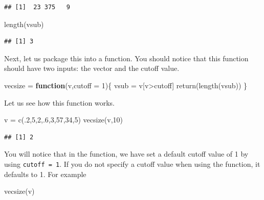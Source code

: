 \documentclass[
]{article}
\newenvironment{Shaded}{\begin{snugshade}}{\end{snugshade}}
\newcommand{\AttributeTok}[1]{\textcolor[rgb]{0.77,0.63,0.00}{#1}}
\newcommand{\ControlFlowTok}[1]{\textcolor[rgb]{0.13,0.29,0.53}{\textbf{#1}}}
\newcommand{\DecValTok}[1]{\textcolor[rgb]{0.00,0.00,0.81}{#1}}
\newcommand{\FunctionTok}[1]{\textcolor[rgb]{0.00,0.00,0.00}{#1}}
\newcommand{\NormalTok}[1]{#1}
\newcommand{\OtherTok}[1]{\textcolor[rgb]{0.56,0.35,0.01}{#1}}
\newcommand{\SpecialCharTok}[1]{\textcolor[rgb]{0.00,0.00,0.00}{#1}}
\begin{document}
\begin{verbatim}
## [1]  23 375   9
\end{verbatim}

\begin{Shaded}
\begin{Highlighting}[]
\FunctionTok{length}\NormalTok{(vsub)}
\end{Highlighting}
\end{Shaded}

\begin{verbatim}
## [1] 3
\end{verbatim}

Next, let us package this into a function. You should notice that this
function should have two inputs: the vector and the cutoff value.

\begin{Shaded}
\begin{Highlighting}[]
\NormalTok{vecsize }\OtherTok{=} \ControlFlowTok{function}\NormalTok{(v,}\AttributeTok{cutoff =} \DecValTok{1}\NormalTok{)\{}
\NormalTok{  vsub }\OtherTok{=}\NormalTok{ v[v}\SpecialCharTok{\textgreater{}}\NormalTok{cutoff]}
  \FunctionTok{return}\NormalTok{(}\FunctionTok{length}\NormalTok{(vsub))}
\NormalTok{\}}
\end{Highlighting}
\end{Shaded}

Let us see how this function works.

\begin{Shaded}
\begin{Highlighting}[]
\NormalTok{v }\OtherTok{=} \FunctionTok{c}\NormalTok{(.}\DecValTok{2}\NormalTok{,}\DecValTok{5}\NormalTok{,}\DecValTok{2}\NormalTok{,.}\DecValTok{6}\NormalTok{,}\DecValTok{3}\NormalTok{,}\DecValTok{57}\NormalTok{,}\DecValTok{34}\NormalTok{,}\DecValTok{5}\NormalTok{)}
\FunctionTok{vecsize}\NormalTok{(v,}\DecValTok{10}\NormalTok{)}
\end{Highlighting}
\end{Shaded}

\begin{verbatim}
## [1] 2
\end{verbatim}

You will notice that in the function, we have set a default cutoff value
of 1 by using \texttt{cutoff\ =\ 1}. If you do not specify a cutoff
value when using the function, it defaults to 1. For example

\begin{Shaded}
\begin{Highlighting}[]
\FunctionTok{vecsize}\NormalTok{(v)}
\end{Highlighting}
\end{Shaded}
\end{document}
